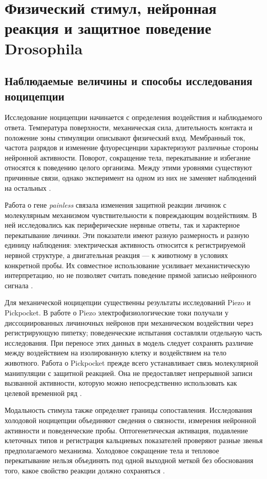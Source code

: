 \section{Физический стимул, нейронная реакция и защитное поведение Drosophila}
\label{sec:constructs}

\subsection{Наблюдаемые величины и способы исследования ноцицепции}

Исследование ноцицепции начинается с определения воздействия и наблюдаемого ответа. Температура поверхности, механическая сила, длительность контакта и положение зоны стимуляции описывают физический вход. Мембранный ток, частота разрядов и изменение флуоресценции характеризуют различные стороны нейронной активности. Поворот, сокращение тела, перекатывание и избегание относятся к поведению целого организма. Между этими уровнями существуют причинные связи, однако эксперимент на одном из них не заменяет наблюдений на остальных \cite{s778,s810,s031}.

Работа о гене \textit{painless} связала изменения защитной реакции личинок с молекулярным механизмом чувствительности к повреждающим воздействиям. В ней исследовались как периферические нервные ответы, так и характерное перекатывание личинки. Эти показатели имеют разную размерность и разную единицу наблюдения: электрическая активность относится к регистрируемой нервной структуре, а двигательная реакция --- к животному в условиях конкретной пробы. Их совместное использование усиливает механистическую интерпретацию, но не позволяет считать поведение прямой записью нейронного сигнала \cite{s778}.

Для механической ноцицепции существенны результаты исследований Piezo и Pickpocket. В работе о Piezo электрофизиологические токи получали у диссоциированных личиночных нейронов при механическом воздействии через регистрирующую пипетку; поведенческие испытания составляли отдельную часть исследования. При переносе этих данных в модель следует сохранять различие между воздействием на изолированную клетку и воздействием на тело животного. Работа о Pickpocket прежде всего устанавливает связь молекулярной манипуляции с защитной реакцией. Она не предоставляет непрерывной записи вызванной активности, которую можно непосредственно использовать как целевой временной ряд \cite{s810,s795}.

Модальность стимула также определяет границы сопоставления. Исследования холодовой ноцицепции объединяют сведения о связности, измерения нейронной активности и поведенческие пробы. Оптогенетическая активация, подавление клеточных типов и регистрация кальциевых показателей проверяют разные звенья предполагаемого механизма. Холодовое сокращение тела и тепловое перекатывание нельзя объединять под одной выходной меткой без обоснования того, какое свойство реакции должно сохраняться \cite{s031,s901}.

